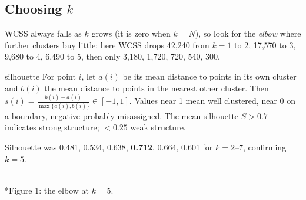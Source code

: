 \documentclass[11pt]{article}
\begin{document}
\subsection{Choosing $k$}
WCSS always falls as $k$ grows (it is zero when $k=N$), so look for the \emph{elbow} where further clusters buy little: here WCSS drops 42,240 from $k=1$ to 2, 17,570 to 3, 9,680 to 4, 6,490 to 5, then only 3,180, 1,720, 720, 540, 300.
\begin{definition}{silhouette}
For point $i$, let $a(i)$ be its mean distance to points in its own cluster and $b(i)$ the mean distance to points in the nearest other cluster. Then $s(i)=\frac{b(i)-a(i)}{\max\{a(i),b(i)\}}\in[-1,1]$. Values near 1 mean well clustered, near 0 on a boundary, negative probably misassigned. The mean silhouette $S>0.7$ indicates strong structure; $<0.25$ weak structure.
\end{definition}
Silhouette was 0.481, 0.534, 0.638, \textbf{0.712}, 0.664, 0.601 for $k=2$--7, confirming $k=5$.
\begin{center}\\*{\small\color{GreyN}Figure 1: the elbow at $k=5$.}\end{center}
\end{document}
